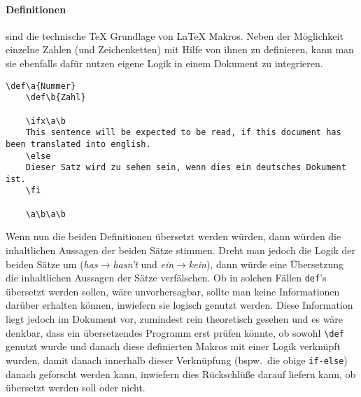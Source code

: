 \paragraph*{Definitionen\label{par:definitionen}} sind die technische \TeX{} Grundlage von \LaTeX{} Makros. Neben der Möglichkeit einzelne Zahlen (und Zeichenketten) mit Hilfe von ihnen zu definieren, kann man sie ebenfalls dafür nutzen eigene Logik in einem Dokument zu integrieren. 
\begin{Verbatim}[breaklines=true, breakanywhere=true]
    \def\a{Nummer}
    \def\b{Zahl}

    \ifx\a\b
    This sentence will be expected to be read, if this document has been translated into english.
    \else
    Dieser Satz wird zu sehen sein, wenn dies ein deutsches Dokument ist.
    \fi

    \a\b\a\b
\end{Verbatim}
Wenn nun die beiden Definitionen übersetzt werden würden, dann würden die inhaltlichen Aussagen der beiden Sätze stimmen. Dreht man jedoch die Logik der beiden Sätze um (\textit{has}$\rightarrow$\textit{hasn't} und \textit{ein}$\rightarrow$\textit{kein}), dann würde eine Übersetzung die inhaltlichen Aussagen der Sätze verfälschen. Ob in solchen Fällen \texttt{def}'s übersetzt werden sollen, wäre unvorhersagbar, sollte man keine Informationen darüber erhalten können, inwiefern sie logisch genutzt werden. Diese Information liegt jedoch im Dokument vor, zumindest rein theoretisch gesehen und es wäre denkbar, dass ein übersetzendes Programm erst prüfen könnte, ob sowohl \verb|\def| genutzt wurde und danach diese definierten Makros mit einer Logik verknüpft wurden, damit danach innerhalb dieser Verknüpfung (bspw.\ die obige \texttt{if-else}) danach geforscht werden kann, inwiefern dies Rückschlüße darauf liefern kann, ob übersetzt werden soll oder nicht.

